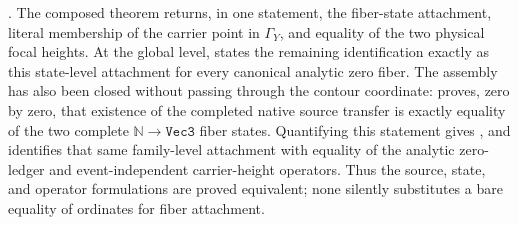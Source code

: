 \documentclass[11pt]{article}
\theoremstyle{definition}
\begin{document}
.  The composed theorem
 returns, in one statement, the
fiber-state attachment, literal membership of the carrier point in
\(\Gamma_Y\), and equality of the two physical focal heights.  At the global
level,
states the remaining identification exactly as this state-level attachment
for every canonical analytic zero fiber.  The assembly has also been closed
without passing through the contour coordinate:
proves, zero by zero, that existence of the completed native source transfer
is exactly equality of the two complete \(\mathbb N\to\texttt{Vec3}\) fiber
states.  Quantifying this statement gives
, and
 identifies
that same family-level attachment with equality of the analytic zero-ledger
and event-independent carrier-height operators.  Thus the source, state, and
operator formulations are proved equivalent; none silently substitutes a
bare equality of ordinates for fiber attachment.
\end{document}
